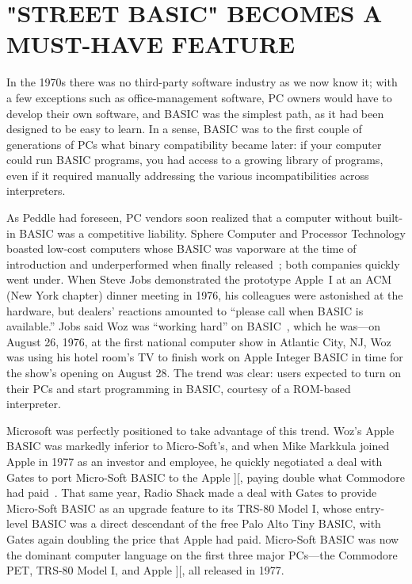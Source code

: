 
\section{"STREET BASIC" BECOMES A MUST-HAVE FEATURE}


In the 1970s there was no third-party software industry as we now know
it; with a few exceptions such as office-management software, PC owners
would have to develop their own software, and BASIC was the simplest
path, as it had been designed to be easy to learn.
In a sense, BASIC was to the first couple of generations of PCs what
binary compatibility became later: if your computer could run BASIC
programs, you had access to a growing library of programs, even if it
required manually addressing the various incompatibilities across
interpreters.

As Peddle had foreseen, PC vendors soon realized that a computer without
built-in BASIC was a competitive liability.
Sphere Computer and Processor Technology boasted low-cost computers
whose BASIC was vaporware at the time of introduction and underperformed
when finally released~\cite[p. 114, 134]{veit}; both companies quickly
went under.
When Steve Jobs demonstrated the prototype Apple~I at an ACM (New York
chapter) dinner meeting in 1976, his colleagues were astonished at the
hardware, but dealers' reactions amounted to ``please call when BASIC is
available.''
Jobs said Woz was ``working hard'' on BASIC~\cite[pp. 92ff]{veit}, which
he was---on August 26, 1976, at the first national computer show in
Atlantic City, NJ, Woz was using his hotel room's TV to finish work on
Apple Integer BASIC in time for the show's opening on August 28.
The trend was clear: users expected to turn on their PCs and
start programming in BASIC, courtesy of a ROM-based interpreter.

Microsoft was perfectly positioned to take advantage of this trend.
Woz's Apple BASIC was markedly inferior to Micro-Soft's, and when Mike
Markkula joined Apple in 1977 as an investor and employee, he
quickly negotiated a deal with Gates to port Micro-Soft BASIC to
the Apple ][, paying double what Commodore had
paid~\cite[p. 114]{commodore}.
That same year, Radio Shack made a deal with Gates to provide Micro-Soft
BASIC as an upgrade feature to its TRS-80 Model I, whose entry-level BASIC
was a direct descendant of the free Palo Alto Tiny BASIC, with Gates
again doubling the price that Apple had paid.
Micro-Soft BASIC was now the dominant computer language on the first
three major PCs---the Commodore PET, TRS-80 Model I, and Apple ][, all
released in 1977.

